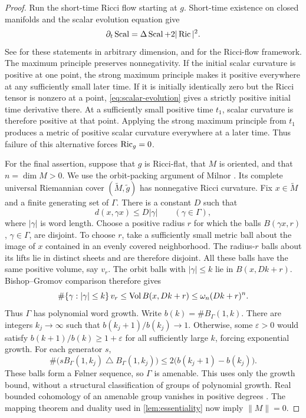 \begin{proof}
Run the short-time Ricci flow starting at $g$. Short-time existence on closed
manifolds and the scalar evolution equation give
\begin{equation}\label{eq:scalar-evolution}
 \partial_t\operatorname{Scal}=\Delta\operatorname{Scal}+2|\operatorname{Ric}|^2.
\end{equation}
See \cite[Theorem~5.2.1 and Proposition~2.5.4]{Topping2006} for these
statements in arbitrary dimension, and \cite{Hamilton1982} for the
Ricci-flow framework. The maximum principle
preserves nonnegativity. If the initial scalar curvature is positive at one
point, the strong maximum principle makes it positive everywhere at any
sufficiently small later time. If it is initially identically zero but the
Ricci tensor is nonzero at a point, \eqref{eq:scalar-evolution} gives a
strictly positive initial time derivative there. At a sufficiently small positive time $t_1$, scalar curvature is
therefore positive at that point. Applying the strong maximum principle
from $t_1$ produces a metric of positive scalar curvature everywhere at
a later time. Thus failure of this alternative
forces $\operatorname{Ric}_g=0$.

For the final assertion, suppose that $g$ is Ricci-flat, that $M$ is
oriented, and that $n=\dim M>0$. We use the orbit-packing argument
of Milnor \cite[Theorem~1]{Milnor1968}. Its complete universal Riemannian cover
$(\widetilde M,\widetilde g)$ has nonnegative Ricci curvature. Fix
$x\in\widetilde M$ and a finite generating set of $\Gamma$. There is a
constant $D$ such that
\[
 d(x,\gamma x)\le D|\gamma|
 \qquad(\gamma\in\Gamma),
\]
where $|\gamma|$ is word length. Choose a positive radius $r$ for which the
balls $B(\gamma x,r)$, $\gamma\in\Gamma$, are disjoint. To choose $r$, take a sufficiently small metric ball about the image of
$x$ contained in an evenly covered neighborhood. The radius-$r$ balls
about its lifts lie in distinct sheets and are therefore disjoint. All these
balls have the same positive volume, say $v_r$. The orbit balls with
$|\gamma|\le k$ lie in $B(x,Dk+r)$. Bishop--Gromov comparison \cite[Theorem~4.1]{Wei2007} therefore gives
\[
 \#\{\gamma:|\gamma|\le k\}\,v_r
 \le \operatorname{Vol} B(x,Dk+r)\le \omega_n(Dk+r)^n.
\]
Thus $\Gamma$ has polynomial word growth. Write
$b(k)=\#B_\Gamma(1,k)$. There are integers $k_j\to\infty$ such that
$b(k_j+1)/b(k_j)\to1$. Otherwise, some $\varepsilon>0$ would satisfy
$b(k+1)/b(k)\ge1+\varepsilon$ for all sufficiently large $k$, forcing
exponential growth. For each generator $s$,
\[
 \#\bigl(sB_\Gamma(1,k_j)\mathbin\triangle B_\Gamma(1,k_j)\bigr)
 \le2\bigl(b(k_j+1)-b(k_j)\bigr).
\]
These balls form a F\o lner sequence, so $\Gamma$ is amenable. This
uses only the growth bound, without a structural classification of groups
of polynomial growth. Real bounded
cohomology of an amenable group vanishes in positive degrees
\cite[Sections~3.0--3.1]{Gromov1982}. The mapping
theorem and duality used in \cref{lem:essentiality} now imply
$\|M\|=0$.
\end{proof}

